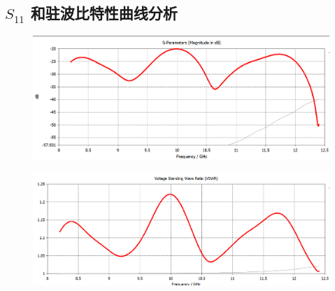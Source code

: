 \documentclass{source/Report}
\begin{document}
\subsection{$S_{11}$ 和驻波比特性曲线分析}
\begin{figure}[H]
    \begin{center}
        \includegraphics[width=0.8\linewidth]{pic/cb2_p16.png}
        \caption{}
    \end{center}
\end{figure}
\begin{figure}[H]
    \begin{center}
        \includegraphics[width=0.8\linewidth]{pic/cb2_p17.png}
        \caption{}
    \end{center}
\end{figure}
\end{document}
